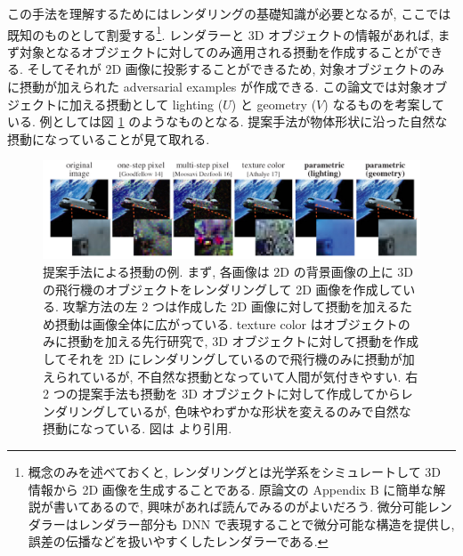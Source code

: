 この手法を理解するためにはレンダリングの基礎知識が必要となるが, ここでは既知のものとして割愛する\footnote{
概念のみを述べておくと, レンダリングとは光学系をシミュレートして 3D 情報から 2D 画像を生成することである.
原論文の Appendix B に簡単な解説が書いてあるので, 興味があれば読んでみるのがよいだろう.
微分可能レンダラーはレンダラー部分も DNN で表現することで微分可能な構造を提供し, 誤差の伝播などを扱いやすくしたレンダラーである.
}.
レンダラーと 3D オブジェクトの情報があれば, まず対象となるオブジェクトに対してのみ適用される摂動を作成することができる.
そしてそれが 2D 画像に投影することができるため, 対象オブジェクトのみに摂動が加えられた adversarial examples が作成できる.
この論文では対象オブジェクトに加える摂動として lighting ($U$) と geometry ($V$) なるものを考案している.
例としては図 \ref{fig:beyond-pixel-example} のようなものとなる.
提案手法が物体形状に沿った自然な摂動になっていることが見て取れる.
%
\begin{figure}[htbp]
\begin{center}
\includegraphics[width=14.0cm]{figures/beyond-pixel-example.pdf}
\end{center}
\caption{
提案手法による摂動の例.
まず, 各画像は 2D の背景画像の上に 3D の飛行機のオブジェクトをレンダリングして 2D 画像を作成している.
攻撃方法の左 2 つは作成した 2D 画像に対して摂動を加えるため摂動は画像全体に広がっている.
texture color はオブジェクトのみに摂動を加える先行研究で, 3D オブジェクトに対して摂動を作成してそれを 2D にレンダリングしているので飛行機のみに摂動が加えられているが, 不自然な摂動となっていて人間が気付きやすい.
右 2 つの提案手法も摂動を 3D オブジェクトに対して作成してからレンダリングしているが, 色味やわずかな形状を変えるのみで自然な摂動になっている.
図は \cite{liu2018beyond} より引用.
}
\label{fig:beyond-pixel-example}
\end{figure}
%


